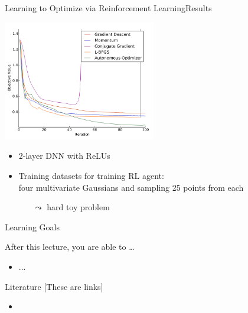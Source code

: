 \begin{frame}[c]{Learning to Optimize via Reinforcement Learning\newline Results }

\centering
\includegraphics[width=0.5\textwidth]{images/l2o_dnn}

\begin{itemize}
\item 2-layer DNN with ReLUs
\item Training datasets for training RL agent:\\ four multivariate Gaussians and sampling 25 points from each
\begin{itemize}
\item[$\leadsto$] hard toy problem
\end{itemize}
\end{itemize}

\end{frame}


\begin{frame}[c]{Learning Goals}

After this lecture, you are able to \ldots

\begin{itemize}
	\item ...
\end{itemize}
\end{frame}

\begin{frame}[c]{Literature [These are links]}

\begin{itemize}
	\item \lit{\href{}{}}	
\end{itemize}

\end{frame}


